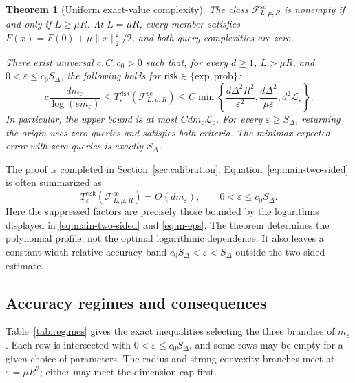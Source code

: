 \documentclass[11pt]{article}
\newcommand{\logfac}{\mathcal L_\eps}
\newcommand{\cF}{\mathcal{F}}
\newcommand{\eps}{\varepsilon}
\newcommand{\norm}[1]{\lVert #1\rVert_2}
\theoremstyle{plain}
\newtheorem{theorem}{Theorem}[section]
\theoremstyle{definition}
\begin{document}
\begin{theorem}[Uniform exact-value complexity]\label{thm:main}
The class $\cF^{\mathrm{sc}}_{L,\mu,R}$ is nonempty if and only if
$L\ge\mu R$. At $L=\mu R$, every member satisfies
$F(x)=F(0)+\mu\norm{x}^2/2$, and both query complexities are zero.

There exist universal $c,C,c_0>0$ such that, for every $d\ge1$,
$L>\mu R$, and $0<\eps\le c_0S_\Delta$, the following holds for
$\mathsf{risk}\in\{\mathrm{exp},\mathrm{prob}\}$:
\begin{equation}\label{eq:main-two-sided}
 c\frac{d m_\eps}{\log(e m_\eps)}
 \le T^{\mathsf{risk}}_\eps(\cF^{\mathrm{sc}}_{L,\mu,R})
 \le C\min\left\{
       \frac{d\Delta^2R^2}{\eps^2},
       \frac{d\Delta^2}{\mu\eps},
       d^2\logfac\right\}.
\end{equation}
In particular, the upper bound is at most $C d m_\eps\logfac$.
For every $\eps\ge S_\Delta$, returning the origin uses zero queries
and satisfies both criteria. The minimax expected error with zero
queries is exactly $S_\Delta$.
\end{theorem}

The proof is completed in Section~\ref{sec:calibration}.
Equation~\eqref{eq:main-two-sided} is often summarized as
\begin{equation}\label{eq:tilde-theta}
 T^{\mathsf{risk}}_\eps(\cF^{\mathrm{sc}}_{L,\mu,R})
 =\widetilde\Theta(d m_\eps),
 \qquad 0<\eps\le c_0S_\Delta.
\end{equation}
Here the suppressed factors are precisely those bounded by the
logarithms displayed in \eqref{eq:main-two-sided} and \eqref{eq:m-eps}.
The theorem determines the polynomial profile, not the optimal
logarithmic dependence. It also leaves a constant-width relative
accuracy band $c_0S_\Delta<\eps<S_\Delta$ outside the two-sided estimate.

\subsection{Accuracy regimes and consequences}

Table~\ref{tab:regimes} gives the exact inequalities selecting the
three branches of $m_\eps$. Each row is intersected with
$0<\eps\le c_0S_\Delta$, and some rows may be empty for a given
choice of parameters. The radius and strong-convexity branches meet
at $\eps=\mu R^2$; either may meet the dimension cap first.
\end{document}
